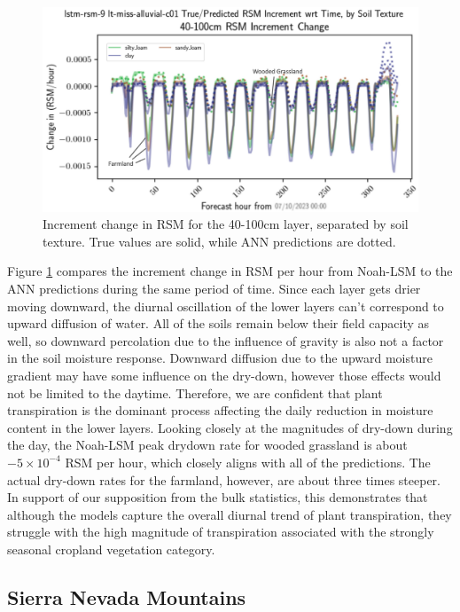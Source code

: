 \begin{figure}[h!p]
    \centering

    \includegraphics[width=.85\linewidth,draft=false]{figures/lt-miss-alluvial/eval-grid_lt-miss-alluvial-c01_lstm-rsm-9_rsm_keep-all_bias_res-seq-textures-all.png}

    \caption{Increment change in RSM for the 40-100cm layer, separated by soil texture. True values are solid, while ANN predictions are dotted.}
    \label{lt_sequence-c01-res_miss-alluvial}
\end{figure}

Figure \ref{lt_sequence-c01-res_miss-alluvial} compares the increment change in RSM per hour from Noah-LSM to the ANN predictions during the same period of time. Since each layer gets drier moving downward, the diurnal oscillation of the lower layers can't correspond to upward diffusion of water. All of the soils remain below their field capacity as well, so downward percolation due to the influence of gravity is also not a factor in the soil moisture response. Downward diffusion due to the upward moisture gradient may have some influence on the dry-down, however those effects would not be limited to the daytime. Therefore, we are confident that plant transpiration is the dominant process affecting the daily reduction in moisture content in the lower layers. Looking closely at the magnitudes of dry-down during the day, the Noah-LSM peak drydown rate for wooded grassland is about $-5\times10^{-4}$ RSM per hour, which closely aligns with all of the predictions. The actual dry-down rates for the farmland, however, are about three times steeper. In support of our supposition from the bulk statistics, this demonstrates that although the models capture the overall diurnal trend of plant transpiration, they struggle with the high magnitude of transpiration associated with the strongly seasonal cropland vegetation category.

\subsection{Sierra Nevada Mountains}

